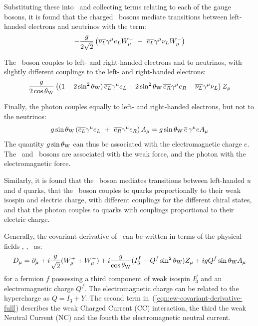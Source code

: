 Substituting these into~ and collecting terms
relating to each of the gauge bosons, it is found that the
charged \Wpm\ bosons mediate transitions between left-handed electrons and
neutrinos with the term:
\begin{equation}
- \frac{g}{2\sqrt{2}} \left( \overline{\nu_{L}} \gamma^{\mu} e_{L} W^{+}_{\mu}
\ + \  \overline{e_{L}} \gamma^{\mu} \nu_{L} W^{-}_{\mu} \right)
\end{equation}

The \Z\ boson couples to left- and right-handed electrons and to
neutrinos, with slightly different couplings to the left- and right-handed
electrons:
\begin{equation}
\frac{g}{2 \cos{\ensuremath{\theta_{\mathrm{W}}}}} \left( 
(1 - 2 \sin^{2}{\theta_{\mathrm{W}}})\, \overline{e_{L}} \gamma^{\mu} e_{L}  - 2 \sin^{2}{\theta_{\mathrm{W}}}\, \overline{e_{R}} \gamma^{\mu} e_{R} 
- \overline{\nu_{L}} \gamma^{\mu} \nu_{L} 
\right)Z_{\mu}
\end{equation}

Finally, the photon couples equally to left- and right-handed electrons, but not to the
neutrinos:
\begin{equation}
g \sin{\ensuremath{\theta_{\mathrm{W}}}} \left( \overline{e_{L}} \gamma^{\mu} e_{L} 
\ + \ \overline{e_{R}} \gamma^{\mu} e_{R} \right) A_{\mu}
 = g \sin{\ensuremath{\theta_{\mathrm{W}}}} \, \overline{e}\, \gamma^{\mu} e A_{\mu}
\end{equation}
The quantity $g \sin{\ensuremath{\theta_{\mathrm{W}}}}$ can thus be associated with the electromagnetic
charge $e$. The \W\ and \Z\ bosons are associated with the weak force, and the photon
with the electromagnetic force. 

Similarly, it is found that the \W\ boson mediates
transitions between left-handed $u$ and $d$ quarks, that the
\Z\ boson couples to quarks proportionally to their weak isospin and electric
charge, with different couplings for the different chiral states, and that the photon couples to
quarks with couplings proportional to their electric charge.

Generally, the covariant derivative of~ can be
written in terms of the physical fields \Wpmmu, \Zmu, \Amu\ as:
\begin{equation}
D_{\mu}  =  \partial_{\mu} + i \frac{g}{\sqrt{2}} ( W^{+}_{\mu} + W^{-}_{\mu} ) 
+ i \frac{g}{\cos{\ensuremath{\theta_{\mathrm{W}}}}} ( I^{f}_{3} - Q^{f} \sin^{2}{\theta_{\mathrm{W}}} ) Z_{\mu}
+ i g Q^{f} \sin{\ensuremath{\theta_{\mathrm{W}}}} A_{\mu}
\label{eqn:ew-covariant-derivative-full}
\end{equation}
for a fermion $f$ possessing a third component of weak isospin $I_{3}^{f}$
and an electromagnetic charge $Q^{f}$. The electromagnetic charge can be related
to the hypercharge as $Q = I_{3} + Y$. The second term
in~(\ref{eqn:ew-covariant-derivative-full}) describes the weak Charged Current (CC)
interaction, the third the weak Neutral Current (NC) and the fourth the
electromagnetic neutral current.


